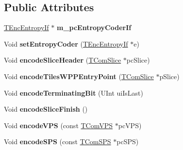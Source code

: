 \subsection*{Public Attributes}
\begin{DoxyCompactItemize}
\item 
\mbox{\label{class_t_enc_entropy_a5c80306d902b4ac513ef2f595bd3eae7}} 
\hyperlink{class_t_enc_entropy_if}{T\+Enc\+Entropy\+If} $\ast$ {\bfseries m\+\_\+pc\+Entropy\+Coder\+If}
\end{DoxyCompactItemize}
\begin{DoxyCompactItemize}
\item 
\mbox{\label{class_t_enc_entropy_ab5d7648b74ee7c6068eac06da7929d51}} 
Void {\bfseries set\+Entropy\+Coder} (\hyperlink{class_t_enc_entropy_if}{T\+Enc\+Entropy\+If} $\ast$e)
\item 
\mbox{\label{class_t_enc_entropy_a641df5eda4d5dd39db2ac25491d6b0aa}} 
Void {\bfseries encode\+Slice\+Header} (\hyperlink{class_t_com_slice}{T\+Com\+Slice} $\ast$pc\+Slice)
\item 
\mbox{\label{class_t_enc_entropy_a711c9bf9cf8ca70be6247cd89f2b3b30}} 
Void {\bfseries encode\+Tiles\+W\+P\+P\+Entry\+Point} (\hyperlink{class_t_com_slice}{T\+Com\+Slice} $\ast$p\+Slice)
\item 
\mbox{\label{class_t_enc_entropy_ab540239770cc89912e80299986e81b7f}} 
Void {\bfseries encode\+Terminating\+Bit} (U\+Int ui\+Is\+Last)
\item 
\mbox{\label{class_t_enc_entropy_a05b241341befbdee608049c6decdf578}} 
Void {\bfseries encode\+Slice\+Finish} ()
\item 
\mbox{\label{class_t_enc_entropy_ae0096e83428e9be8dbdbab3094c5a7f4}} 
Void {\bfseries encode\+V\+PS} (const \hyperlink{class_t_com_v_p_s}{T\+Com\+V\+PS} $\ast$pc\+V\+PS)
\item 
\mbox{\label{class_t_enc_entropy_ad43c43e2d05e369cb20c3a4468acd788}} 
Void {\bfseries encode\+S\+PS} (const \hyperlink{class_t_com_s_p_s}{T\+Com\+S\+PS} $\ast$pc\+S\+PS)
\item 

\end{DoxyCompactItemize}
